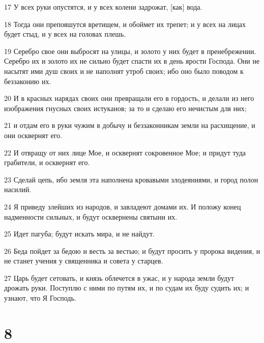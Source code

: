 \par 17 У всех руки опустятся, и у всех колени задрожат, [как] вода.
\par 18 Тогда они препояшутся вретищем, и обоймет их трепет; и у всех на лицах будет стыд, и у всех на головах плешь.
\par 19 Серебро свое они выбросят на улицы, и золото у них будет в пренебрежении. Серебро их и золото их не сильно будет спасти их в день ярости Господа. Они не насытят ими душ своих и не наполнят утроб своих; ибо оно было поводом к беззаконию их.
\par 20 И в красных нарядах своих они превращали его в гордость, и делали из него изображения гнусных своих истуканов; за то и сделаю его нечистым для них;
\par 21 и отдам его в руки чужим в добычу и беззаконникам земли на расхищение, и они осквернят его.
\par 22 И отвращу от них лице Мое, и осквернят сокровенное Мое; и придут туда грабители, и осквернят его.
\par 23 Сделай цепь, ибо земля эта наполнена кровавыми злодеяниями, и город полон насилий.
\par 24 Я приведу злейших из народов, и завладеют домами их. И положу конец надменности сильных, и будут осквернены святыни их.
\par 25 Идет пагуба; будут искать мира, и не найдут.
\par 26 Беда пойдет за бедою и весть за вестью; и будут просить у пророка видения, и не станет учения у священника и совета у старцев.
\par 27 Царь будет сетовать, и князь облечется в ужас, и у народа земли будут дрожать руки. Поступлю с ними по путям их, и по судам их буду судить их; и узнают, что Я Господь.

\chapter{8}

